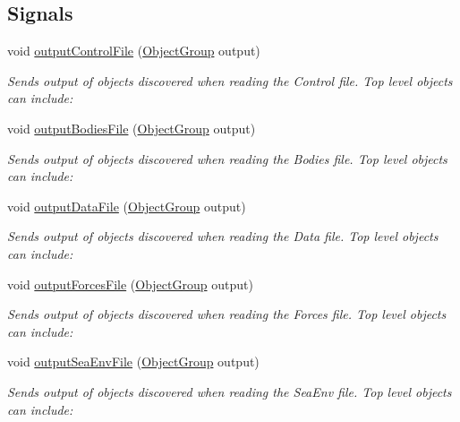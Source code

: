 \subsection*{Signals}
\begin{DoxyCompactItemize}
\item 
void \hyperlink{class_file_reader_a2fda21435e4f7ef58c93f8b64f05ee8c}{output\-Control\-File} (\hyperlink{class_object_group}{Object\-Group} output)
\begin{DoxyCompactList}\small\item\em Sends output of objects discovered when reading the Control file. Top level objects can include\-: \end{DoxyCompactList}\item 
void \hyperlink{class_file_reader_a73b19269f357de1af5e5c6eb853166cb}{output\-Bodies\-File} (\hyperlink{class_object_group}{Object\-Group} output)
\begin{DoxyCompactList}\small\item\em Sends output of objects discovered when reading the Bodies file. Top level objects can include\-: \end{DoxyCompactList}\item 
void \hyperlink{class_file_reader_a4eb74832371513a52a171496c8a0b57e}{output\-Data\-File} (\hyperlink{class_object_group}{Object\-Group} output)
\begin{DoxyCompactList}\small\item\em Sends output of objects discovered when reading the Data file. Top level objects can include\-: \end{DoxyCompactList}\item 
void \hyperlink{class_file_reader_a5d7638af68315cafeb8798f6e3afff4a}{output\-Forces\-File} (\hyperlink{class_object_group}{Object\-Group} output)
\begin{DoxyCompactList}\small\item\em Sends output of objects discovered when reading the Forces file. Top level objects can include\-: \end{DoxyCompactList}\item 
void \hyperlink{class_file_reader_a4dfb029654b8b5095f3d389a643278b8}{output\-Sea\-Env\-File} (\hyperlink{class_object_group}{Object\-Group} output)
\begin{DoxyCompactList}\small\item\em Sends output of objects discovered when reading the Sea\-Env file. Top level objects can include\-: \end{DoxyCompactList}\end{DoxyCompactItemize}
